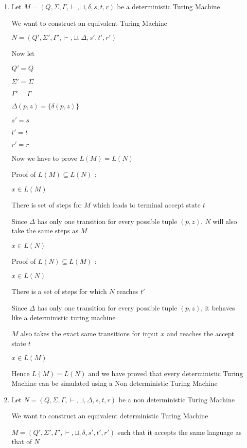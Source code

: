 \begin{enumerate}
\item 
Let $M = (Q, \Sigma, \Gamma, \vdash, \sqcup, \delta, s, t, r)$ be a deterministic Turing Machine 

We want to construct an equivalent Turing Machine 

$N = (Q', \Sigma', \Gamma', \vdash, \sqcup, \Delta, s', t', r')$

Now let

$Q' = Q$

$\Sigma' = \Sigma$

$\Gamma' = \Gamma$

$\Delta(p, z) = \{\delta(p, z)\}$

$s' = s$

$t' = t$

$r' = r$

Now we have to prove $L(M) = L(N)$

Proof of $L(M) \subseteq L(N)$ :


$x \in L(M)$

\imp
There is set of steps for $M$ which leads to terminal accept state $t$

\imp
Since $\Delta$ has only one transition for every possible tuple $(p, z)$, $N$ will also take the same steps as $M$

\imp
$x \in L(N)$

Proof of $L(N) \subseteq L(M)$ : 

$x \in L(N)$

\imp
There is a set of steps for which $N$ reaches $t'$

\imp
Since $\Delta$ has only one transition for every possible tuple $(p, z)$, it behaves like a deterministic turing machine

\imp
$M$ also takes the exact same transitions for input $x$ and reaches the accept state $t$

\imp
$x \in L(M)$

Hence $L(M) = L(N)$ and we have proved that every deterministic Turing Machine can be simulated using a Non deterministic Turing Machine

\item 
Let $N = (Q, \Sigma, \Gamma, \vdash, \sqcup, \Delta, s, t, r)$ be a non deterministic Turing Machine 

We want to construct an equivalent deterministic Turing Machine 

$M = (Q', \Sigma', \Gamma', \vdash, \sqcup, \delta, s', t', r')$ such that it accepts the same language as that of $N$


\end{enumerate}
